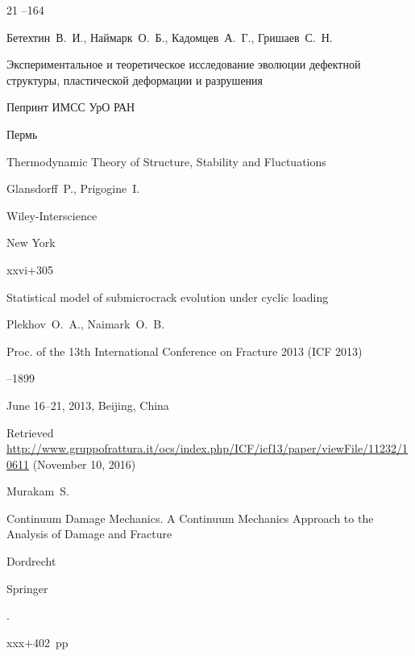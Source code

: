 \begin{thebibliography}{21}
--164




\by Бетехтин~В.~И., Наймарк~О.~Б., Кадомцев~А.~Г., Гришаев~С.~Н.

\preprint Экспериментальное и теоретическое исследование эволюции дефектной структуры, пластической деформации и разрушения

\preprintinfo Пепринт ИМСС УрО РАН

\publaddr Пермь






\book Thermodynamic Theory of Structure, Stability and Fluctuations

\by Glansdorff~P.,  Prigogine~I.

\publ Wiley-Interscience

\publaddr New York


\totalpages xxvi+305




\paper Statistical model of submicrocrack evolution under cyclic loading

\by Plekhov~O.~A., Naimark~O.~B.

\inbook Proc. of the 13th International Conference on Fracture 2013 \rm (ICF 2013)


--1899

\procinfo June 16–21, 2013, Beijing, China

\elink Retrieved  \url{http://www.gruppofrattura.it/ocs/index.php/ICF/icf13/paper/viewFile/11232/10611} {(November 10, 2016)}




\by Murakam~S.

\book  Continuum Damage Mechanics. A Continuum Mechanics Approach to the Analysis of Damage and Fracture

\publaddr Dordrecht

\publ Springer

.

\totalpages xxx+402~pp





\end{thebibliography}
